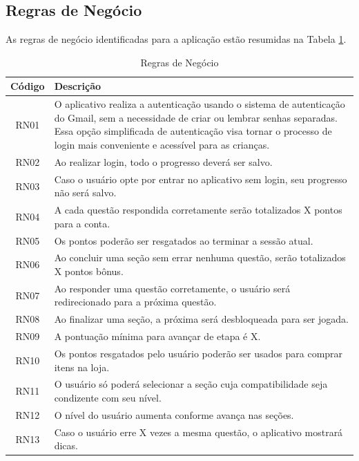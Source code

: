 \subsection{Regras de Negócio}

As regras de negócio identificadas para a aplicação estão resumidas na Tabela \ref{tab:regras_negocio}.

\begin{table}[H]
    \centering
    \caption{Regras de Negócio}
    \label{tab:regras_negocio}
    \begin{tabular}{|c|p{12cm}|}
        \hline
        \textbf{Código} & \textbf{Descrição} \\
        \hline
        RN01 & O aplicativo realiza a autenticação usando o sistema de autenticação do Gmail, sem a necessidade de criar ou lembrar senhas separadas. Essa opção simplificada de autenticação visa tornar o processo de login mais conveniente e acessível para as crianças. \\
        \hline
        RN02 & Ao realizar login, todo o progresso deverá ser salvo. \\
        \hline
        RN03 & Caso o usuário opte por entrar no aplicativo sem login, seu progresso não será salvo. \\
        \hline
        RN04 & A cada questão respondida corretamente serão totalizados X pontos para a conta. \\
        \hline
        RN05 & Os pontos poderão ser resgatados ao terminar a sessão atual. \\
        \hline
        RN06 & Ao concluir uma seção sem errar nenhuma questão, serão totalizados X pontos bônus. \\
        \hline
        RN07 & Ao responder uma questão corretamente, o usuário será redirecionado para a próxima questão. \\
        \hline
        RN08 & Ao finalizar uma seção, a próxima será desbloqueada para ser jogada. \\
        \hline
        RN09 & A pontuação mínima para avançar de etapa é X. \\
        \hline
        RN10 & Os pontos resgatados pelo usuário poderão ser usados para comprar itens na loja. \\
        \hline
        RN11 & O usuário só poderá selecionar a seção cuja compatibilidade seja condizente com seu nível. \\
        \hline
        RN12 & O nível do usuário aumenta conforme avança nas seções. \\
        \hline
        RN13 & Caso o usuário erre X vezes a mesma questão, o aplicativo mostrará dicas. \\
        \hline
    \end{tabular}
\end{table}

